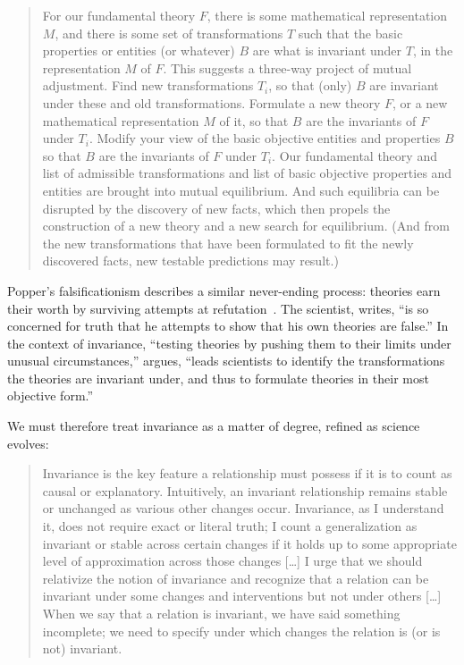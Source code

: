 \begin{quote}
For our fundamental theory $F$, there is some mathematical representation $M$, and there is some set of transformations $T$ such that the basic properties or entities (or whatever) $B$ are what is invariant under $T$, in the representation $M$ of $F$. This suggests a three-way project of mutual adjustment. Find new transformations $T_i$, so that (only) $B$ are invariant under these and old transformations. Formulate a new theory $F$, or a new mathematical representation $M$ of it, so that $B$ are the invariants of $F$ under $T_i$. Modify your view of the basic objective entities and properties $B$ so that $B$ are the invariants of $F$ under $T_i$. Our fundamental theory and list of admissible transformations and list of basic objective properties and entities are brought into mutual equilibrium. And such equilibria can be disrupted by the discovery of new facts, which then propels the construction of a new theory and a new search for equilibrium. (And from the new transformations that have been formulated to fit the newly discovered facts, new testable predictions may result.) \citep[p. 82]{nozick2001}\label{quote:science}
\end{quote}

Popper's falsificationism describes a similar never-ending process: theories earn their worth by surviving attempts at refutation~\citep{popper1959}. The scientist, \citet[p. 18]{gaukroger2012} writes, ``is so concerned for truth that he attempts to show that his own theories are false.'' In the context of invariance, ``testing theories by pushing them to their limits under unusual circumstances,'' \citet[p. 103]{nozick2001} argues, ``leads scientists to identify the transformations the theories are invariant under, and thus to formulate theories in their most objective form.''

We must therefore treat invariance as a matter of degree, refined as science evolves:
\begin{quote}
Invariance is the key feature a relationship must possess if it is to count as causal or explanatory. Intuitively, an invariant relationship remains stable or unchanged as various other changes occur. Invariance, as I understand it, does not require exact or literal truth; I count a generalization as invariant or stable across certain changes if it holds up to some appropriate level of approximation across those changes [\ldots] I urge that we should relativize the notion of invariance and recognize that a relation can be invariant under some changes and interventions but not under others [\ldots] When we say that a relation is invariant, we have said something incomplete; we need to specify under which changes the relation is (or is not) invariant. \citep[pp. 239--243]{woodward2003}
\end{quote}


